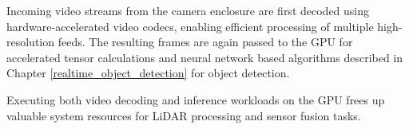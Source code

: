 \documentclass{erauthesis}
\begin{document}
Incoming video streams from the camera enclosure are first decoded using hardware-accelerated video codecs, enabling efficient processing of multiple high-resolution feeds.
The resulting frames are again passed to the GPU for accelerated tensor calculations and neural network based algorithms described in Chapter \ref{realtime_object_detection} for object detection.

Executing both video decoding and inference workloads on the GPU frees up valuable system resources for LiDAR processing and sensor fusion tasks.





\end{document}
